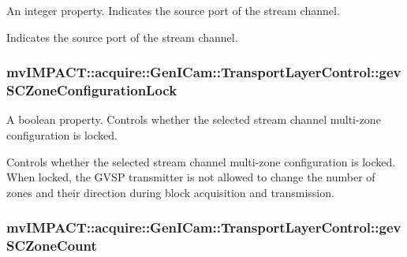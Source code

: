 An integer property. Indicates the source port of the stream channel. 

Indicates the source port of the stream channel. \hypertarget{classmv_i_m_p_a_c_t_1_1acquire_1_1_gen_i_cam_1_1_transport_layer_control_a8e8e110de119568d89b0883b8fb1c4b7}{
\subsubsection[{gev\+S\+C\+Zone\+Configuration\+Lock}]{ mv\+I\+M\+P\+A\+C\+T\+::acquire\+::\+Gen\+I\+Cam\+::\+Transport\+Layer\+Control\+::gev\+S\+C\+Zone\+Configuration\+Lock}}\label{classmv_i_m_p_a_c_t_1_1acquire_1_1_gen_i_cam_1_1_transport_layer_control_a8e8e110de119568d89b0883b8fb1c4b7}


A boolean property. Controls whether the selected stream channel multi-\/zone configuration is locked. 

Controls whether the selected stream channel multi-\/zone configuration is locked. When locked, the G\+V\+S\+P transmitter is not allowed to change the number of zones and their direction during block acquisition and transmission. \hypertarget{classmv_i_m_p_a_c_t_1_1acquire_1_1_gen_i_cam_1_1_transport_layer_control_a6081d6029229cc73075f5d58f1c2da91}{
\subsubsection[{gev\+S\+C\+Zone\+Count}]{ mv\+I\+M\+P\+A\+C\+T\+::acquire\+::\+Gen\+I\+Cam\+::\+Transport\+Layer\+Control\+::gev\+S\+C\+Zone\+Count}}\label{classmv_i_m_p_a_c_t_1_1acquire_1_1_gen_i_cam_1_1_transport_layer_control_a6081d6029229cc73075f5d58f1c2da91}


